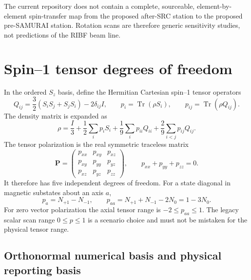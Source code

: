 \documentclass[11pt,a4paper]{article}
\newcommand{\Tens}{\bm P}
\newcommand{\Tr}{\operatorname{Tr}}
\begin{document}
The current repository does not contain a complete, sourceable, element-by-
element spin-transfer map from the proposed after-SRC station to the proposed
pre-SAMURAI station.  Rotation scans are therefore generic sensitivity studies,
not predictions of the RIBF beam line.

\section{Spin--1 tensor degrees of freedom}

In the ordered $S_z$ basis, define the Hermitian Cartesian spin--1 tensor
operators
\begin{equation}
 Q_{ij}=\frac{3}{2}(S_iS_j+S_jS_i)-2\delta_{ij}I,
 \qquad
 p_i=\Tr(\rho S_i),
 \qquad
 p_{ij}=\Tr(\rho Q_{ij}).
\end{equation}
The density matrix is expanded as
\begin{equation}
 \rho=\frac{I}{3}
 +\frac12\sum_i p_iS_i
 +\frac19\sum_i p_{ii}Q_{ii}
 +\frac29\sum_{i<j}p_{ij}Q_{ij}.
 \label{eq:rho-expansion}
\end{equation}
The tensor polarization is the real symmetric traceless matrix
\begin{equation}
 \Tens=
 \begin{pmatrix}
 p_{xx}&p_{xy}&p_{xz}\\
 p_{xy}&p_{yy}&p_{yz}\\
 p_{xz}&p_{yz}&p_{zz}
 \end{pmatrix},
 \qquad
 p_{xx}+p_{yy}+p_{zz}=0.
 \label{eq:tensor}
\end{equation}
It therefore has five independent degrees of freedom.  For a state diagonal in
magnetic substates about an axis $a$,
\begin{equation}
 p_a=N_{+1}-N_{-1},
 \qquad
 p_{aa}=N_{+1}+N_{-1}-2N_0=1-3N_0.
\end{equation}
For zero vector polarization the axial tensor range is
$-2\leq p_{aa}\leq1$.  The legacy scalar scan range $0\leq p\leq1$ is a
scenario choice and must not be mistaken for the physical tensor range.

\subsection{Orthonormal numerical basis and physical reporting basis}
\end{document}
